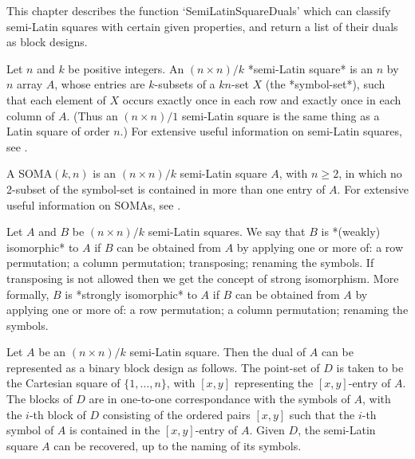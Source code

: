 %
%
%
%
\def\GRAPE{\sf GRAPE}
\def\DESIGN{\sf DESIGN}
\def\nauty{\it nauty}
\def\Aut{{\rm Aut}\,} 


This chapter describes the function `SemiLatinSquareDuals' which can
classify semi-Latin squares with certain given properties, and return
a list of their duals as block designs.


Let $n$ and $k$ be positive integers. An $(n\times n)/k$ *semi-Latin
square* is an $n$ by $n$ array $A$, whose
entries are $k$-subsets of a $kn$-set $X$ (the *symbol-set*), such that
each element of $X$ occurs exactly once in each row and exactly once in
each column of $A$. (Thus an $(n\times n)/1$ semi-Latin square is the same
thing as a Latin square of order $n$.) For extensive useful information on
semi-Latin squares, see .

A SOMA$(k,n)$ is an $(n\times n)/k$ semi-Latin square $A$,
with $n\ge2$, in which no 2-subset of the symbol-set is contained in
more than one entry of $A$.  For extensive useful information on SOMAs,
see .

Let $A$ and $B$ be $(n\times n)/k$ semi-Latin squares.  We say that
$B$ is *(weakly) isomorphic* to $A$ if $B$ can be obtained from $A$
by applying one or more of: a row permutation; a column permutation;
transposing; renaming the symbols. If transposing is not allowed then we
get the concept of strong isomorphism. More formally, $B$ is *strongly
isomorphic* to $A$ if $B$ can be obtained from $A$ by applying one or
more of: a row permutation; a column permutation; renaming the symbols.

Let $A$ be an $(n\times n)/k$  semi-Latin square.  Then the dual of $A$
can be represented as a binary block design as follows. The point-set of
$D$ is taken to be the Cartesian square of $\{1,\ldots,n\}$, with $[x,y]$
representing the $[x,y]$-entry of $A$. The blocks of $D$ are in one-to-one
correspondance with the symbols of $A$, with the $i$-th block of $D$
consisting of the ordered pairs $[x,y]$ such that the $i$-th symbol of
$A$ is contained in the $[x,y]$-entry of $A$. Given $D$, the semi-Latin
square $A$ can be recovered, up to the naming of its symbols.

